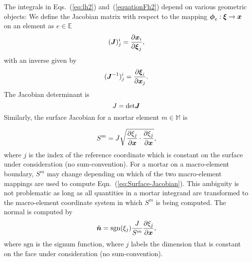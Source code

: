 The integrals in Eqs.~(\ref{eq:lh2}) and~(\ref{equationFh2}) depend on various geometric objects:
We define the Jacobian matrix with respect to the mapping $\boldsymbol{\phi}_e: \boldsymbol{\xi} \rightarrow \boldsymbol{x}$ on an element as $e \in \mathbb{E}$
%
 \begin{equation}
    (\boldsymbol{J})^i_j = \frac{\partial \boldsymbol{x}_i}{\partial \boldsymbol{\xi}_j},
 \end{equation}
%
with an inverse given by
%
 \begin{equation}
    (\boldsymbol{J}^{-1})^i_j = \frac{\partial \boldsymbol{\xi}_i}{\partial \boldsymbol{x}_j}.
 \end{equation}
%
The Jacobian determinant is
%
 \begin{equation}\label{eq:Jacobian}
   J = \text{det}\boldsymbol{J}
 \end{equation}
%
 Similarly, the surface Jacobian for a mortar element $m \in \mathbb{M}$ is

 \begin{equation}\label{eq:Surface-Jacobian}
   S^m = J\sqrt{\frac{\partial \xi_j}{\partial \boldsymbol{x}} \cdot \frac{\partial \xi_j}{\partial \boldsymbol{x}}},
 \end{equation}
 where $j$ is the index of the reference coordinate which is constant on the surface under consideration (no sum-convention).
 For a mortar on a macro-element boundary, $S^m$ may change depending on which of the two macro-element mappings are used to compute Eqn.~(\ref{eq:Surface-Jacobian}). This ambiguity is not problematic as long as all quantities in a mortar integrand are transformed to the macro-element coordinate system in which $S^m$ is being computed.
%
The normal is computed by
\begin{equation}
 \Hat{\boldsymbol{n}} = \text{sgn}(\xi_j)\frac{J}{S^m}\frac{\partial \xi_j}{\partial \boldsymbol{x}},
\end{equation}
%
where $\text{sgn}$ is the signum function, where $j$ labels the dimension that is constant on the face under consideration (no sum-convention).
 
